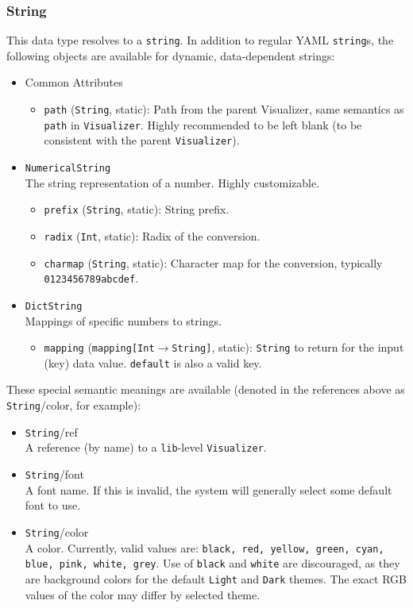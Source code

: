 \documentclass[11pt]{article}
\begin{document}
\subsubsection {String}
This data type resolves to a \texttt{string}. In addition to regular YAML \texttt{string}s, the following objects are available for dynamic, data-dependent strings:
\begin{itemize}
  \item Common Attributes
  \begin{itemize}
    \item \texttt{path} (\texttt{String}, static): Path from the parent Visualizer, same semantics as \texttt{path} in \texttt{Visualizer}. Highly recommended to be left blank (to be consistent with the parent \texttt{Visualizer}).
  \end{itemize}    
  \item \texttt{NumericalString} \\
  The string representation of a number. Highly customizable.
  \begin{itemize}
    \item \texttt{prefix} (\texttt{String}, static): String prefix.
    \item \texttt{radix} (\texttt{Int}, static): Radix of the conversion.
    \item \texttt{charmap} (\texttt{String}, static): Character map for the conversion, typically \texttt{0123456789abcdef}.
  \end{itemize}
  \item \texttt{DictString} \\
  Mappings of specific numbers to strings.
  \begin{itemize}
    \item \texttt{mapping} (\texttt{mapping[Int$\rightarrow$String]}, static): \texttt{String} to return for the input (key) data value. \texttt{default} is also a valid key.
  \end{itemize}
\end{itemize}
  
These special semantic meanings are available (denoted in the references above as \texttt{String}/color, for example):
\begin{itemize}
  \item \texttt{String}/ref \\
  A reference (by name) to a \texttt{lib}-level \texttt{Visualizer}.
  \item \texttt{String}/font \\
  A font name. If this is invalid, the system will generally select some default font to use.
  \item \texttt{String}/color \\
  A color. Currently, valid values are: \texttt{black, red, yellow, green, cyan, blue, pink, white, grey}. Use of \texttt{black} and \texttt{white} are discouraged, as they are background colors for the default \texttt{Light} and \texttt{Dark} themes. The exact RGB values of the color may differ by selected theme.
\end{itemize}
  
\end{document}
